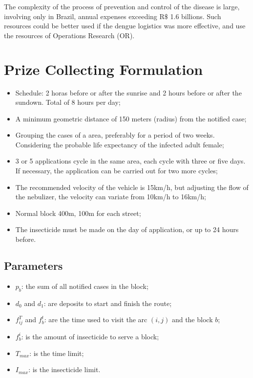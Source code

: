 \documentclass[a4paper,11pt]{article}
\begin{document}
The complexity of the process of prevention and control of the disease is large,
involving only  in Brazil,  annual expenses exceeding  R$\$$ 1.6  billions. Such
resources could be  better used if the dengue logistics  was more effective, and
use the resources of Operations Research (OR).

\section{Prize Collecting Formulation} \label{sec:formulation}

\begin{itemize}
    \item Schedule: 2 horas before or after the sunrise and 2 hours before or after the sundown. Total of 8 hours per day;
    \item A minimum geometric distance of 150 meters (radius) from the notified case; 
    \item Grouping the cases of a area, preferably for a period of two weeks. Considering the probable life expectancy of the infected adult female;
    \item 3 or 5 applications cycle in the same area, each cycle with three or five days. If necessary, the application can be carried out for two more cycles;
    \item The recommended velocity of the vehicle is 15km/h, but adjusting the flow of the nebulizer, the velocity can variate from 10km/h to 16km/h;
    \item Normal block 400m, 100m for each street;
    \item The insecticide must be made on the day of application, or up to 24 hours before.
\end{itemize}

\subsection{Parameters}
\begin{itemize}
    \item $p_b$: the sum of all notified cases in the block;
    \item $d_0$ and $d_1$: are deposits to start and finish the route;
    \item $f^T_{ij}$ and $f^t_{b}$: are the time used to visit the arc $(i, j)$ and the block $b$;
    \item $f^i_{b}$: is the amount of insecticide to serve a block;
    \item $T_{max}$: is the time limit;
    \item $I_{max}$: is the insecticide limit.
\end{itemize}
\end{document}
